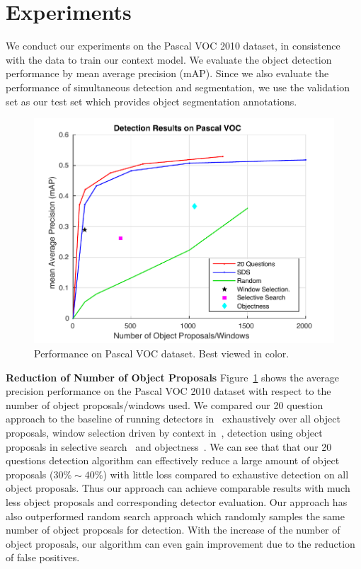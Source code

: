 \section{Experiments}

We conduct our experiments on the Pascal VOC 2010 dataset, in consistence with the data to train our context model. We evaluate the object detection performance by mean average precision (mAP). Since we also evaluate the performance of simultaneous detection and segmentation, we use the validation set as our test set which provides object segmentation annotations. 


\begin{figure}[htb!]
\begin{center}
\includegraphics[width=0.6\linewidth]{figures/numprop.pdf}
\end{center}
\caption{Performance on Pascal VOC dataset. Best viewed in color. }
\label{fig:mapVSnumprop}
\end{figure}

{\bf Reduction of Number of Object Proposals} 
Figure~\ref{fig:mapVSnumprop} shows the average precision performance on the Pascal VOC 2010 dataset with respect to the number of object proposals/windows used. We compared our 20 question approach to the baseline of running detectors in~\cite{BharathECCV2014} exhaustively over all object proposals,  window selection driven by context in~\cite{bogdan2012context}, detection using object proposals in selective search~\cite{van2011segmentation} and objectness~\cite{alexe2010object}. We can see that that our 20 questions detection algorithm can effectively reduce a large amount of object proposals ($30\% \sim 40\%$) with little loss compared to exhaustive detection on all object proposals.  Thus our approach can achieve comparable results with much less object proposals and corresponding detector evaluation. Our approach has also outperformed random search approach which randomly samples the same number of object proposals for detection. With the increase of the number of object proposals, our algorithm can even gain improvement due to the reduction of false positives. 

